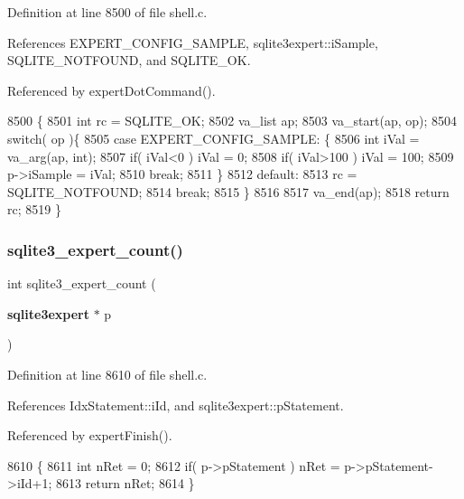 Definition at line 8500 of file shell.\+c.



References E\+X\+P\+E\+R\+T\+\_\+\+C\+O\+N\+F\+I\+G\+\_\+\+S\+A\+M\+P\+LE, sqlite3expert\+::i\+Sample, S\+Q\+L\+I\+T\+E\+\_\+\+N\+O\+T\+F\+O\+U\+ND, and S\+Q\+L\+I\+T\+E\+\_\+\+OK.



Referenced by expert\+Dot\+Command().


\begin{DoxyCode}
8500                                                         \{
8501   \textcolor{keywordtype}{int} rc = SQLITE_OK;
8502   va\_list ap;
8503   va\_start(ap, op);
8504   \textcolor{keywordflow}{switch}( op )\{
8505     \textcolor{keywordflow}{case} EXPERT_CONFIG_SAMPLE: \{
8506       \textcolor{keywordtype}{int} iVal = va\_arg(ap, \textcolor{keywordtype}{int});
8507       \textcolor{keywordflow}{if}( iVal<0 ) iVal = 0;
8508       \textcolor{keywordflow}{if}( iVal>100 ) iVal = 100;
8509       p->iSample = iVal;
8510       \textcolor{keywordflow}{break};
8511     \}
8512     \textcolor{keywordflow}{default}:
8513       rc = SQLITE_NOTFOUND;
8514       \textcolor{keywordflow}{break};
8515   \}
8516 
8517   va\_end(ap);
8518   \textcolor{keywordflow}{return} rc;
8519 \}
\end{DoxyCode}
\mbox{\label{shell_8c_a277541ee4f73b7a6da52bdbaec2d309d}} 
\subsubsection{sqlite3\+\_\+expert\+\_\+count()}
{\footnotesize\ttfamily int sqlite3\+\_\+expert\+\_\+count (\begin{DoxyParamCaption}\item[{\textbf{ sqlite3expert} $\ast$}]{p }\end{DoxyParamCaption})}



Definition at line 8610 of file shell.\+c.



References Idx\+Statement\+::i\+Id, and sqlite3expert\+::p\+Statement.



Referenced by expert\+Finish().


\begin{DoxyCode}
8610                                           \{
8611   \textcolor{keywordtype}{int} nRet = 0;
8612   \textcolor{keywordflow}{if}( p->pStatement ) nRet = p->pStatement->iId+1;
8613   \textcolor{keywordflow}{return} nRet;
8614 \}
\end{DoxyCode}
\mbox{\label{shell_8c_a8fb9b42d4dacb06efe2beeb5dd4d4788}} 
